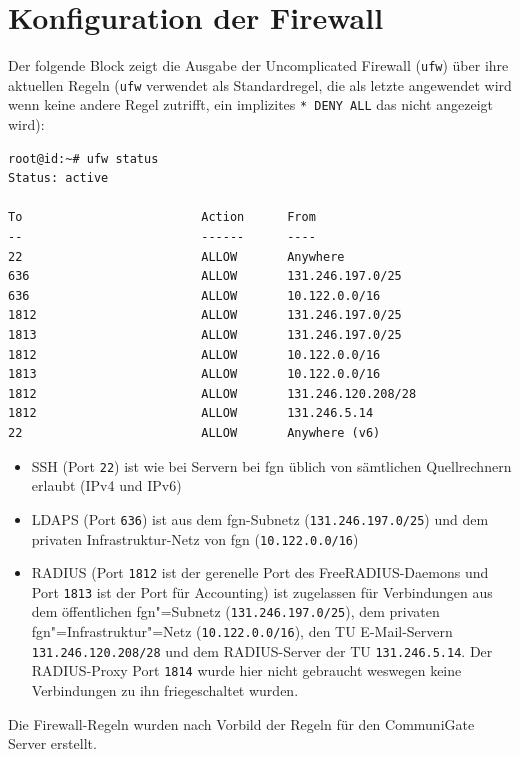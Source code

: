 \documentclass[11pt,a4paper,titlepage=firstiscover,headsepline,bibtotoc]{scrartcl} %
\begin{document}
\section{Konfiguration der Firewall}\label{sec:Firewall-Konfig}
Der folgende Block zeigt die Ausgabe der Uncomplicated Firewall (\texttt{ufw}) über ihre aktuellen Regeln (\texttt{ufw} verwendet als Standardregel, die als letzte angewendet wird wenn keine andere Regel zutrifft, ein implizites \texttt{* DENY ALL} das nicht angezeigt wird):
\begin{lstlisting}
root@id:~# ufw status
Status: active

To                         Action      From
--                         ------      ----
22                         ALLOW       Anywhere
636                        ALLOW       131.246.197.0/25
636                        ALLOW       10.122.0.0/16
1812                       ALLOW       131.246.197.0/25
1813                       ALLOW       131.246.197.0/25
1812                       ALLOW       10.122.0.0/16
1813                       ALLOW       10.122.0.0/16
1812                       ALLOW       131.246.120.208/28
1812                       ALLOW       131.246.5.14
22                         ALLOW       Anywhere (v6)
\end{lstlisting}
\begin{itemize}
\item SSH (Port \texttt{22}) ist wie bei Servern bei fgn üblich von sämtlichen Quellrechnern erlaubt (IPv4 und IPv6)
\item LDAPS (Port \texttt{636}) ist aus dem fgn-Subnetz (\texttt{131.246.197.0/25}) und dem privaten Infrastruktur-Netz von fgn (\texttt{10.122.0.0/16})
\item RADIUS (Port \texttt{1812} ist der gerenelle Port des FreeRADIUS-Daemons und Port \texttt{1813} ist der Port für Accounting) ist zugelassen für Verbindungen aus dem öffentlichen fgn"=Subnetz (\texttt{131.246.197.0/25}), dem privaten fgn"=Infrastruktur"=Netz (\texttt{10.122.0.0/16}), den TU E-Mail-Servern \texttt{131.246.120.208/28} und dem RADIUS-Server der TU \texttt{131.246.5.14}. Der RADIUS-Proxy Port \texttt{1814} wurde hier nicht gebraucht weswegen keine Verbindungen zu ihn friegeschaltet wurden.
\end{itemize}
Die Firewall-Regeln wurden nach Vorbild der Regeln für den CommuniGate Server erstellt.

\newpage
\end{document}
